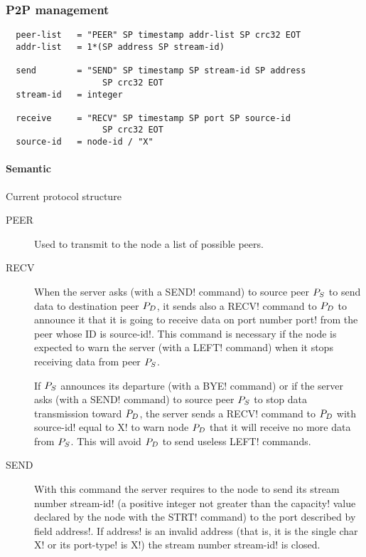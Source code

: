\documentclass{medusabook}
\begin{document}
\subsubsection{P2P management}
\label{subsub:1.3.1.4;medusa_book}

\begin{verbatim}
  peer-list   = "PEER" SP timestamp addr-list SP crc32 EOT
  addr-list   = 1*(SP address SP stream-id)
  
  send        = "SEND" SP timestamp SP stream-id SP address 
                   SP crc32 EOT
  stream-id   = integer
  
  receive     = "RECV" SP timestamp SP port SP source-id 
                   SP crc32 EOT
  source-id   = node-id / "X"
\end{verbatim}

\paragraph{Semantic}
Current protocol structure 

\begin{description}
  \item[PEER]
Used to transmit to the node a list of possible
  peers.  
\item[RECV] When the server asks (with a \ttt SEND! command) to source
  peer $P_{S}$ to send data to destination peer $P_{D}$, it sends
  also a \ttt RECV! command to $P_{D}$ to announce it that it is
  going to receive data on port number \ttt port! from the peer whose
  ID is \ttt source-id!.  This command is necessary if the node is
  expected to warn the server (with a \ttt LEFT! command) when it
  stops receiving data from peer $P_{S}$.

  If $P_{S}$ announces its departure (with a \ttt BYE! command) or
  if the server asks (with a \ttt SEND!  command) to source peer
  $P_{S}$ to stop data transmission toward $P_{D}$, the server
  sends a \ttt RECV! command to $P_{D}$ with \ttt source-id! equal
  to \ttt X! to warn node  $P_{D}$ that it will receive no more data
  from $P_{S}$.  This will avoid $P_{D}$ to send useless
  \ttt LEFT! commands.
\item[SEND]  With this command the server requires to the node to send
  its stream number \ttt stream-id! (a positive integer not greater
  than the \ttt capacity! value declared by the node with the \ttt
  STRT! command) to the port described by field \ttt address!.  If
  \ttt address! is an invalid address (that is, it is the single char
  \ttt X! or its \ttt port-type! is \ttt X!) the stream number \ttt
  stream-id! is closed.
\end{description}
\end{document}
